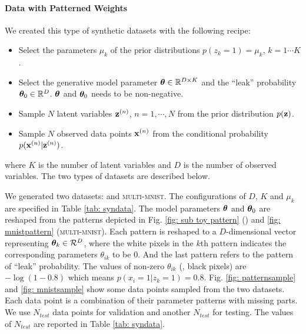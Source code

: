 \paragraph{Data with Patterned Weights} We created this type of synthetic datasets with the following recipe:
\begin{itemize}
\setlength\itemsep{0em}
    \item Select the parameters $\mu_k$ of the prior distributions $p(z_k=1) = \mu_k$, $k = 1 \cdots K$.
    \item Select the generative model parameter $\bm{\theta} \in \mathbb{R}^{D\times K}$ and the ``leak'' probability $\bm{\theta}_0 \in \mathbb{R}^{D}$. $\bm{\theta}$ and $\bm{\theta}_0$ needs to be non-negative.
    \item Sample $N$ latent variables $\mathbf{z}^{(n)}$, $n=1, \cdots, N$ from the prior distribution $p(\mathbf{z})$.
    \item Sample $N$ observed data points $\mathbf{x}^{(n)}$ from the conditional probability $p(\mathbf{x}^{(n)}|\mathbf{z}^{(n)})$.
\end{itemize}
where $K$ is the number of latent variables and $D$ is the number of observed variables. The two types of datasets are described below.

We generated two datasets: \pattern and \textsc{multi-mnist}. The configurations of $D$, $K$ and $\mu_k$ are specified in Table \ref{tab: syndata}.
The model parameters $\bm{\theta}$ and $\bm{\theta}_0$ are reshaped from the patterns depicted in Fig. \ref{fig: sub toy pattern} (\pattern) and \ref{fig: mnistpattern} (\textsc{multi-mnist}). 
Each pattern is reshaped to a $D$-dimensional vector representing $\bm{\theta}_k \in \mathcal{R}^{D}$, 
where the white pixels in the $k$th pattern indicates the corresponding parameters $\theta_{ik}$ to be 0.
And the last pattern refers to the pattern of ``leak'' probability. 
The values of non-zero $\theta_{ik}$ (\ie, black pixels) are $-\log(1-0.8)$ which means $p(x_i=1|z_k=1)=0.8$. 
Fig. \ref{fig: patternsample} and \ref{fig: mnistsample} show some data points sampled from the two datasets. Each data point is a combination of their parameter patterns with missing parts. 
We use $N_{test}$ data points for validation and another $N_{test}$ for testing. The values of $N_{test}$ are reported in Table \ref{tab: syndata}.


